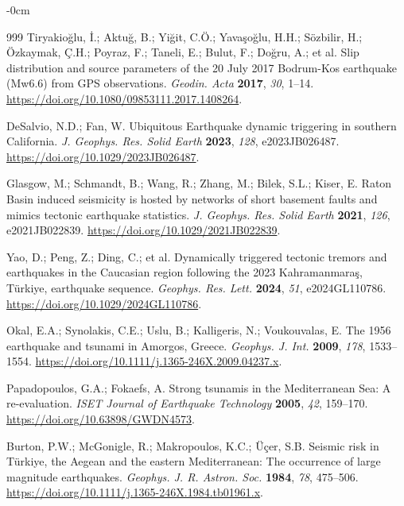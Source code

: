 \documentclass[data,article,accept,pdftex,moreauthors]{Definitions/mdpi}
\begin{document}
\begin{adjustwidth}{-\extralength}{0cm}
\begin{thebibliography}{999}
Tiryakioğlu, İ.; Aktuğ, B.; Yiğit, C.Ö.; Yavaşoğlu, H.H.; Sözbilir, H.; Özkaymak, Ç.H.; Poyraz, F.; Taneli, E.; Bulut, F.; Doğru, A.; et al. Slip distribution and source parameters of the 20 July 2017 Bodrum-Kos earthquake (Mw6.6) from GPS observations. \emph{Geodin. Acta} \textbf{2017}, \emph{30}, 1--14. \url{https://doi.org/10.1080/09853111.2017.1408264}.

DeSalvio, N.D.; Fan, W. Ubiquitous Earthquake dynamic triggering in southern California. \emph{J. Geophys. Res. Solid Earth} \textbf{2023}, \emph{128}, e2023JB026487. \url{https://doi.org/10.1029/2023JB026487}.

Glasgow, M.; Schmandt, B.; Wang, R.; Zhang, M.; Bilek, S.L.; Kiser, E. Raton Basin induced seismicity is hosted by networks of short basement faults and mimics tectonic earthquake statistics. \emph{J. Geophys. Res. Solid Earth} \textbf{2021}, \emph{126}, e2021JB022839. \url{https://doi.org/10.1029/2021JB022839}.

Yao, D.; Peng, Z.; Ding, C.; et al. Dynamically triggered tectonic tremors and earthquakes in the Caucasian region following the 2023 Kahramanmara\c{s}, Türkiye, earthquake sequence. \emph{Geophys. Res. Lett.} \textbf{2024}, \emph{51}, e2024GL110786. \url{https://doi.org/10.1029/2024GL110786}.

Okal, E.A.; Synolakis, C.E.; Uslu, B.; Kalligeris, N.; Voukouvalas, E. The 1956 earthquake and tsunami in Amorgos, Greece. \emph{Geophys. J. Int.} \textbf{2009}, \emph{178}, 1533--1554. \url{https://doi.org/10.1111/j.1365-246X.2009.04237.x}.

Papadopoulos, G.A.; Fokaefs, A. Strong tsunamis in the Mediterranean Sea: A re-evaluation. \emph{ISET Journal of Earthquake Technology} \textbf{2005}, \emph{42}, 159--170. \url{https://doi.org/10.63898/GWDN4573}. %

Burton, P.W.; McGonigle, R.; Makropoulos, K.C.; Üçer, S.B. Seismic risk in Türkiye, the Aegean and the eastern Mediterranean: The occurrence of large magnitude earthquakes. \emph{Geophys. J. R. Astron. Soc.} \textbf{1984}, \emph{78}, 475--506. \url{https://doi.org/10.1111/j.1365-246X.1984.tb01961.x}.


\end{thebibliography}
\end{adjustwidth}
\end{document}

